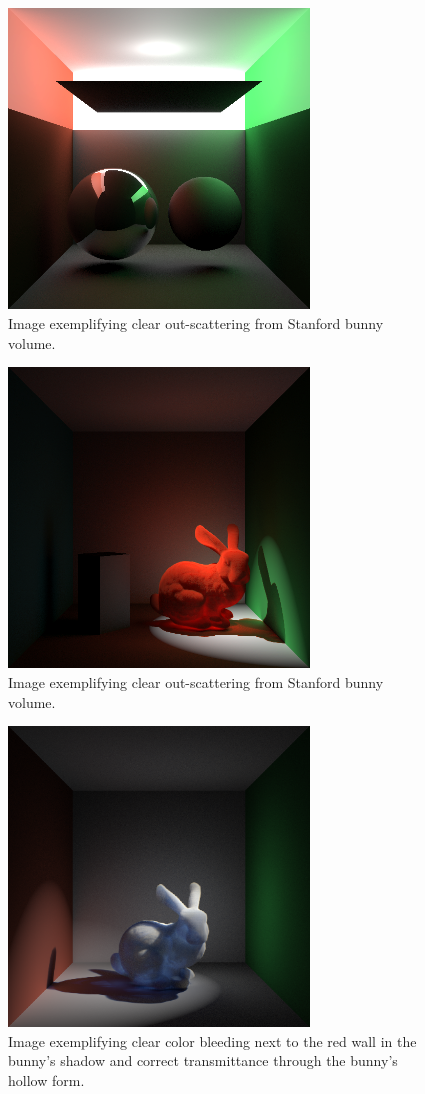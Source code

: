 \documentclass[12pt]{ucthesis}
\begin{document}
\begin{figure}[h!]
    \centering
    \includegraphics[width=80mm]{img/two_sphere_indir.png}
    \caption{Image exemplifying clear out-scattering from Stanford bunny volume.}
\end{figure}

\begin{figure}[h!]
    \centering
    \includegraphics[width=80mm]{img/ketchup_good_corrected.png}
    \caption{Image exemplifying clear out-scattering from Stanford bunny volume.}
\end{figure}

\begin{figure}[h!]
    \centering
    \includegraphics[width=80mm]{img/bunny_spot/spot_right_new.png}
    \caption{Image exemplifying clear color bleeding next to the red wall in the bunny's shadow and correct transmittance through the bunny's hollow form.}
\end{figure}
\end{document}
